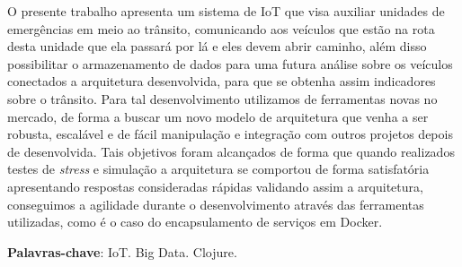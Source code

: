 \setlength{\absparsep}{18pt} %
\begin{resumo}
O presente trabalho apresenta um sistema de IoT que visa auxiliar unidades de emergências em meio ao trânsito, comunicando aos veículos que estão na rota desta unidade que ela passará por lá e eles devem abrir caminho, além disso possibilitar o armazenamento de dados para uma futura análise sobre os veículos conectados a arquitetura desenvolvida, para que se obtenha assim indicadores sobre o trânsito. Para tal desenvolvimento utilizamos de ferramentas novas no mercado, de forma a buscar um novo modelo de arquitetura que venha a ser robusta, escalável e de fácil manipulação e integração com outros projetos depois de desenvolvida. Tais objetivos foram alcançados de forma que quando realizados testes de \textit{stress} e simulação a arquitetura se comportou de forma satisfatória apresentando respostas consideradas rápidas validando assim a arquitetura, conseguimos a agilidade durante o desenvolvimento através das ferramentas utilizadas, como é o caso do encapsulamento de serviços em Docker.

 \textbf{Palavras-chave}: IoT. Big Data. Clojure.
\end{resumo}